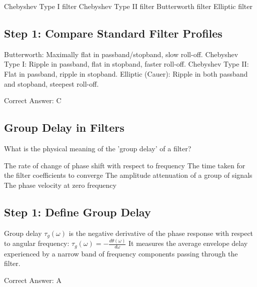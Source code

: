 \begin{choices}
    \choice Chebyshev Type I filter
    \choice Chebyshev Type II filter
    \correctchoice Butterworth filter
    \choice Elliptic filter
\end{choices}

\begin{solution}

\subsection*{Step 1: Compare Standard Filter Profiles}
Butterworth: Maximally flat in passband/stopband, slow roll-off.
Chebyshev Type I: Ripple in passband, flat in stopband, faster roll-off.
Chebyshev Type II: Flat in passband, ripple in stopband.
Elliptic (Cauer): Ripple in both passband and stopband, steepest roll-off.

Correct Answer: C
\end{solution}

\clearpage

\subsection{Group Delay in Filters}

What is the physical meaning of the 'group delay' of a filter?

\begin{choices}
    \correctchoice The rate of change of phase shift with respect to frequency
    \choice The time taken for the filter coefficients to converge
    \choice The amplitude attenuation of a group of signals
    \choice The phase velocity at zero frequency
\end{choices}

\begin{solution}

\subsection*{Step 1: Define Group Delay}
Group delay $\tau_g(\omega)$ is the negative derivative of the phase response with respect to angular frequency:
$\tau_g(\omega) = -\frac{d\theta(\omega)}{d\omega}$
It measures the average envelope delay experienced by a narrow band of frequency components passing through the filter.

Correct Answer: A
\end{solution}

\clearpage

